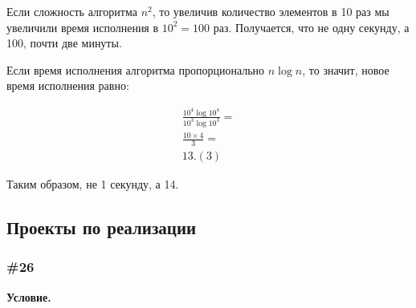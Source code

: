 \documentclass{article}
\begin{document}
Если сложность алгоритма $n^2$, то увеличив количество элементов в 10 раз мы увеличили
время исполнения в $10^2 = 100$ раз.
Получается, что не одну секунду, а 100, почти две минуты.

Если время исполнения алгоритма пропорционально $n \log{n}$, то значит,
новое время исполнения равно:

\begin{eqnarray}
    \frac{10^4 \log{10^4}}{10^3 \log{10^3}} =\\
    \frac{10 \times 4}{3} =\\
    13.(3)
\end{eqnarray}

Таким образом, не 1 секунду, а 14.

\subsection{Проекты по реализации}

\subsubsection{\#26}

\textbf{Условие.}
\end{document}
